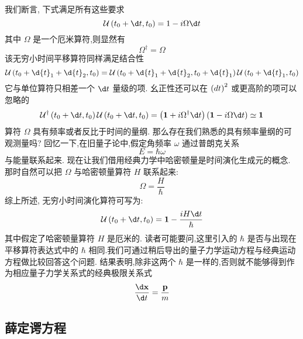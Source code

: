 \documentclass[lang=cn,newtx,10pt,scheme=chinese,thmcnt=section]{elegantbook}
\begin{document}
我们断言, 下式满足所有这些要求
\begin{equation}
	\mathcal{U}\left( {{t}_{0} + {\d t},{t}_{0}}\right) = 1 - {i\Omega \d t}
\end{equation}
其中 $\Omega$ 是一个厄米算符,则显然有
\begin{equation}
	{\Omega }^{ \dagger } = \Omega
\end{equation}
该无穷小时间平移算符同样满足结合性
\begin{equation}
	\mathcal{U}\left( {{t}_{0} + \d{t}_{1} + \d{t}_{2},{t}_{0}}\right) = \mathcal{U}\left( {{t}_{0} + \d{t}_{1} + \d{t}_{2},{t}_{0} + \d{t}_{1}}\right) \mathcal{U}\left( {{t}_{0} + \d{t}_{1},{t}_{0}}\right) 
\end{equation}
它与单位算符只相差一个 ${\d t}$ 量级的项. 幺正性还可以在 ${\left( \\d t\right) }^{2}$ 或更高阶的项可以忽略的
\begin{equation}
	{\mathcal{U}}^{ \dagger }\left( {{t}_{0} + {\d t},{t}_{0}}\right) \mathcal{U}\left( {{t}_{0} + {\d t},{t}_{0}}\right) = \left( {\textbf{1} + i{\Omega }^{ \dagger }{\d t}}\right) \left( {\textbf{1} - {i\Omega \d t}}\right) \simeq \textbf{1}
\end{equation}
算符 $\Omega$ 具有频率或者反比于时间的量纲. 那么存在我们熟悉的具有频率量纲的可观测量吗? 回忆一下,在旧量子论中,假定角频率 $\omega$ 通过普朗克关系
\begin{equation}
	E = \hbar \omega
\end{equation}
与能量联系起来. 现在让我们借用经典力学中哈密顿量是时间演化生成元的概念. 那时自然可以把 $\Omega$ 与哈密顿量算符 $H$ 联系起来:
\begin{equation}
	\Omega = \frac{H}{\hbar }
\end{equation}
综上所述, 无穷小时间演化算符可写为:
\begin{equation}
	\mathcal{U}\left( {{t}_{0} + {\d t},{t}_{0}}\right) = \textbf{1} - \frac{iH\d t}{\hbar }
\end{equation}
其中假定了哈密顿量算符 $H$ 是厄米的. 读者可能要问,这里引入的 $\hbar$ 是否与出现在平移算符表达式中的 $\hbar$ 相同.我们可通过稍后导出的量子力学运动方程与经典运动方程做比较回答这个问题. 结果表明,除非这两个 $\hbar$ 是一样的,否则就不能够得到作为相应量子力学关系式的经典极限关系式
\begin{equation}
	\frac{\d\mathbf{x}}{\d t} = \frac{\mathbf{p}}{m}
\end{equation}
\subsection*{薛定谔方程}
\end{document}
